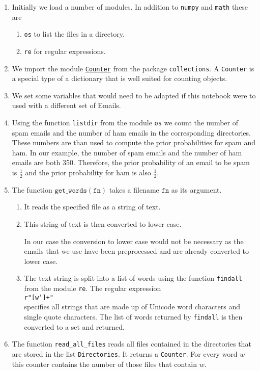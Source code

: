 \begin{enumerate}
\item Initially we load a number of modules.  In addition to \texttt{numpy} and \texttt{math} these are
      \begin{enumerate}
      \item \texttt{os} to list the files in a directory.
      \item \texttt{re} for regular expressions.
      \end{enumerate}
\item We import the module
      \href{https://docs.python.org/2/library/collections.html#counter-objects}{\texttt{Counter}} from the package
      \texttt{collections}.  
      A \texttt{Counter} is a special type of a dictionary that is well suited for counting objects.
\item We set some variables that would need to be adapted if this notebook were to used with a different set of
      Emails.
\item Using the function \texttt{listdir} from the module \texttt{os} we count the number of spam emails and
      the number of ham emails in the corresponding directories.  These numbers are than used to compute the
      prior probabilities for spam and ham.  In our example, the number of spam emails and the number of ham
      emails are both 350.  Therefore, the prior probability of an email to be spam is $\frac{1}{2}$ and the
      prior probability for ham is also $\frac{1}{2}$.
\item The function $\texttt{get\_words}(\texttt{fn})$ takes a filename $\texttt{fn}$ as its argument.  
      \begin{enumerate}
      \item It reads the specified file as a string of text.  
      \item This string of text is then converted to lower case.

            In our case the conversion to lower case would not be necessary as the emails that we use
            have been preprocessed and are already converted to lower case.
      \item The text string is split into a list of words using the function \texttt{findall}
            from the module \texttt{re}.  The regular expression
            \\[0.2cm]
            \hspace*{1.3cm}
            \texttt{r"[w']+"}
            \\[0.2cm]
            specifies all strings that are made up of Unicode word characters and single quote characters.
            The list of words returned by \texttt{findall} is then converted to a set and returned.
      \end{enumerate}
\item The function \texttt{read\_all\_files} reads all files contained in the directories that are stored in
      the list \texttt{Directories}.  It returns a \texttt{Counter}.  For every word $w$ this counter contains the number of
      those files that contain $w$.  
      

\end{enumerate}
